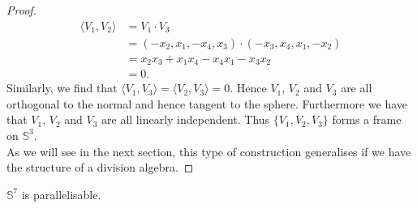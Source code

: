 \documentclass[12pt,a4paper]{article}
\begin{document}
\begin{proof}
\begin{align*}
\langle V_1,V_2\rangle &=V_1\cdot V_3\\
&=(-x_2,x_1,-x_4,x_3)\cdot (-x_3,x_4,x_1,-x_2)\\
&=x_2x_3+x_1x_4-x_4x_1-x_3x_2\\
&=0.
\end{align*}
Similarly, we find that $\langle V_1,V_3\rangle=\langle V_2,V_3\rangle=0$. Hence $V_1$, $V_2$ and $V_3$ are all orthogonal to the normal and hence tangent to the sphere. Furthermore we have that $V_1$, $V_2$ and $V_3$ are all linearly independent. Thus $\{V_1,V_2,V_3\}$ forms a frame on $\mathbb{S}^3$.\\

As we will see in the next section, this type of construction generalises if we have the structure of a division algebra.
\end{proof}
\begin{proposition}
$\mathbb{S}^7$ is parallelisable.
\end{proposition}
\end{document}
